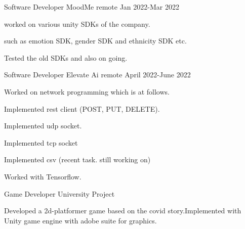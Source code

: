 

\begin{cventries}

 
  \cventry
    {Software Developer} %
    {MoodMe} %
    {remote} %
    {Jan 2022-Mar 2022} %
    {
      \begin{cvitems} %
        \item {worked on various unity SDKs of the company. }
        \item {such as emotion SDK, gender SDK and ethnicity SDK etc.}
        \item {Tested the old SDKs and also on going.}
      \end{cvitems}
    }

 
  \cventry
    {Software Developer} %
    {Elevate Ai} %
    {remote} %
    {April 2022-June 2022} %
    {
      \begin{cvitems} %
        \item {Worked on network programming which is at follows. }
        \item { Implemented rest client (POST, PUT, DELETE). }
		\item { Implemented udp socket. }
        \item { Implemented tcp socket }
        \item { Implemented csv (recent task. still working on) }
        \item { Worked with Tensorflow.}
      \end{cvitems}
    }

  \cventry
    {Game Developer} %
    {University Project} %
    {} %
    {} %
    {
      \begin{cvitems} %
        \item {Developed a 2d-platformer game based on the covid story.Implemented with Unity game engine with adobe suite for graphics.}
      \end{cvitems}
    }


\end{cventries}
